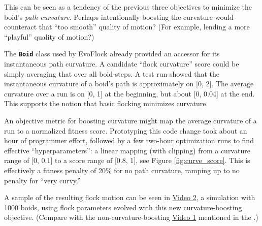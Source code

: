 \documentclass[letterpaper]{article}
\newcommand{\code}[1]{\textbf{\small \texttt{#1}}}
\begin{document}
This can be seen as a tendency of the previous three objectives to minimize the boid's \textit{path curvature}. Perhaps intentionally boosting the curvature would counteract that ``too smooth'' quality of motion? (For example, lending a more ``playful'' quality of motion?)

The \code{Boid} class used by EvoFlock already provided an accessor for its instantaneous path curvature. A candidate ``flock curvature'' score could be simply averaging that over all boid-steps. A test run showed that the instantaneous curvature of a boid's path is approximately on [0, 2]. The average curvature over a run is on [0, 1] at the beginning, but about [0, 0.04] at the end. This supports the notion that basic flocking minimizes curvature.

An objective metric for boosting curvature might map the average curvature of a run to a normalized fitness score. Prototyping this code change took about an hour of programmer effort, followed by a few two-hour optimization runs to find effective ``hyperparameters'': a linear mapping (with clipping) from a curvature range of [0, 0.1] to a score range of [0.8, 1], see Figure \ref{fig:curve_score}. This is effectively a fitness penalty of 20\% for no path curvature, ramping up to no penalty for ``very curvy.'' 

A sample of the resulting flock motion can be seen in \href{https://drive.google.com/file/d/1HOeCqkmY__SiON4TCAQyPKa3CviIlPgM/view?usp=sharing}{Video 2}, a simulation with 1000 boids, using flock parameters evolved with this new curvature-boosting objective. (Compare with the non-curvature-boosting \href{https://drive.google.com/file/d/1ZbanvWVfapnH2TpTqamypWFoXuMeoY9b/view?usp=sharing}{Video 1} mentioned in the .)

\end{document}
